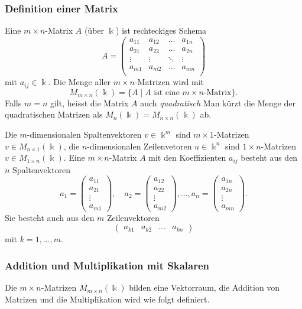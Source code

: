 \subsubsection{Definition einer Matrix}
\begin{definition}
Eine $m\times n$-Matrix $A$ (über $\Bbbk$) ist rechteckiges Schema
%
\[
A
=
\begin{pmatrix}
a_{11}&a_{12}&\dots &a_{1n}\\
a_{21}&a_{22}&\dots &a_{2n}\\
\vdots&\vdots&\ddots&\vdots\\
a_{m1}&a_{m2}&\dots &a_{mn}\\
\end{pmatrix}
\]
mit $a_{ij}\in\Bbbk$.
Die Menge aller $m\times n$-Matrizen wird mit
\[
M_{m\times n}(\Bbbk) = \{ A\;|\; \text{$A$ ist eine $m\times n$-Matrix}\}.
\]
Falls $m=n$ gilt, heisst die Matrix $A$ auch {\em quadratisch}
%
Man kürzt die Menge der quadratischen Matrizen als 
$M_n(\Bbbk) = M_{n\times n}(\Bbbk)$ ab.
\end{definition}

Die $m$-dimensionalen Spaltenvektoren $v\in \Bbbk^m$ sind $m\times 1$-Matrizen 
$v\in M_{n\times 1}(\Bbbk)$, die $n$-dimensionalen Zeilenvetoren $u\in\Bbbk^n$
sind $1\times n$-Matrizen $v\in M_{1\times n}(\Bbbk)$.
Eine $m\times n$-Matrix $A$ mit den Koeffizienten $a_{ij}$ besteht aus 
den $n$ Spaltenvektoren
\[
a_1 = \begin{pmatrix} a_{11} \\ a_{21} \\ \vdots \\ a_{m1} \end{pmatrix},\quad
a_2 = \begin{pmatrix} a_{12} \\ a_{22} \\ \vdots \\ a_{m2} \end{pmatrix},\dots,
a_n = \begin{pmatrix} a_{1n} \\ a_{2n} \\ \vdots \\ a_{mn} \end{pmatrix}.
\]
Sie besteht auch aus den $m$ Zeilenvektoren
\[
\begin{pmatrix} a_{k1} & a_{k2} & \dots & a_{kn} \end{pmatrix}
\]
mit $k=1,\dots,m$.

\subsubsection{Addition und Multiplikation mit Skalaren}
Die $m\times n$-Matrizen $M_{m\times n}(\Bbbk)$ bilden eine Vektorraum,
die Addition von Matrizen und die Multiplikation wird wie folgt definiert.

